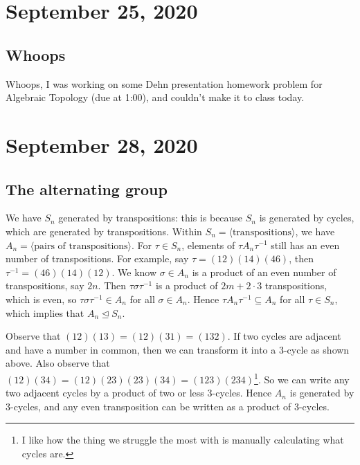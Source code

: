 \section{September 25, 2020}
\subsection{Whoops}
Whoops, I was working on some Dehn presentation homework problem for Algebraic Topology (due at 1:00), and couldn't make it to class today.
\section{September 28, 2020}

\subsection{The alternating group}
We have $S_n$ generated by transpositions: this is because $S_n$ is generated by cycles, which are generated by transpositions. Within $S_n =\langle \text{transpositions} \rangle $, we have $A_n=\langle \text{pairs of transpositions} \rangle $. For $\tau \in S_n$, elements of $\tau A_n \tau^{-1}$ still has an even number of transpositions. For example, say $\tau=(12)(14)(46)$, then $\tau^{-1}=(46)(14)(12)$. We know $\sigma \in A_n$ is a product of an even number of transpositions, say $2n$. Then $\tau\sigma\tau^{-1}$ is a product of $2m+2\cdot 3$ transpositions, which is even, so $\tau\sigma\tau^{-1}\in A_n$ for all $\sigma\in A_n$. Hence $\tau A_n\tau^{-1}\subseteq A_n$ for all $\tau\in S_n$, which implies that $A_n\trianglelefteq S_n$.

Observe that $(12)(13)=(12)(31)=(132)$. If two cycles are adjacent and have a number in common, then we can transform it into a $3$-cycle as shown above. Also observe that $(12)(34)=(12)(23)(23)(34)=(123)(234)$\footnote{I like how the thing we struggle the most with is manually calculating what cycles are.}. So we can write any two adjacent cycles by a product of two or less $3$-cycles. Hence $A_n$ is generated by $3$-cycles, and any even transposition can be written as a product of $3$-cycles.

